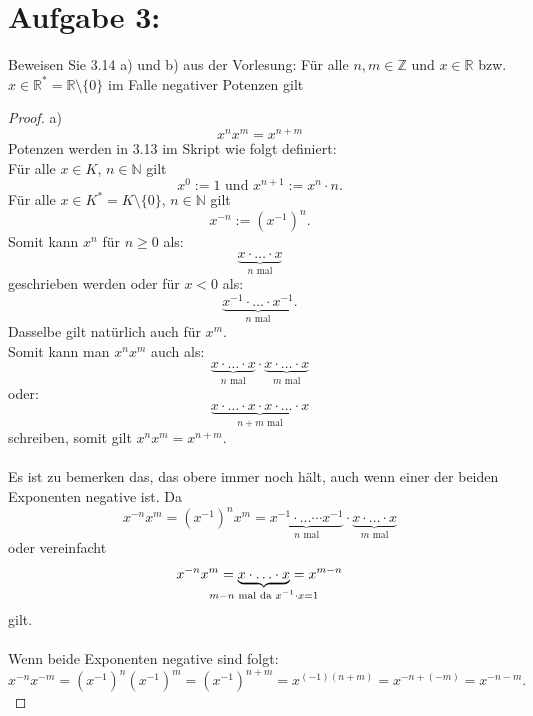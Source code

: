 \documentclass{exam}
\begin{document}
\section*{Aufgabe 3:}
Beweisen Sie 3.14 a) und b) aus der Vorlesung:
\newline\newline
Für alle $n,m \in \mathbb{Z}$ und $x \in \mathbb{R}$ bzw. $x \in \mathbb{R}^* = \mathbb{R}\setminus\{0\}$ im Falle negativer Potenzen gilt
\begin{proof}
	a)
	\begin{displaymath}
		x^nx^m = x^{n+m}
	\end{displaymath}
	Potenzen werden in 3.13 im Skript wie folgt definiert: \\
	Für alle $x \in K$, $n \in \mathbb{N}$ gilt
	\[
		x^0 := 1 \text{ und } x^{n+1}:=x^n \cdot n.
	\]
	Für alle $x \in K^*=K\setminus\{0\}$, $n \in \mathbb{N}$ gilt \[
		x^{-n} := (x^{-1})^n.
	\]
	Somit kann $x^n$ für $n \ge 0$ als: \[
		\underbrace{x \cdot \ldots \cdot x}_{n\text{ mal}}
	\] geschrieben werden oder für $x < 0$ als: \[
		\underbrace{x^{-1} \cdot \ldots \cdot x^{-1}}_{n\text{ mal}}.
	\]
	Dasselbe gilt natürlich auch für $x^m$. \\
	Somit kann man $x^nx^m$ auch als: \[
		\underbrace{x \cdot \ldots \cdot x}_{n\text{ mal}} \cdot \underbrace{x \cdot \ldots \cdot x}_{m\text{ mal}}
	\] oder: \[
		\underbrace{x \cdot \ldots \cdot x \cdot x \cdot \ldots \cdot x}_{n+m\text{ mal}}
	\] schreiben, somit gilt $x^nx^m = x^{n+m}$. \\
	\\
	Es ist zu bemerken das, das obere immer noch hält, auch wenn einer der beiden Exponenten negative ist.
	Da \[
		x^{-n}x^m = {(x^{-1})}^nx^m = \underbrace{x^{-1} \cdot\ldots\cdots x^{-1}}_{n\text{ mal}} \cdot \underbrace{x \cdot \ldots \cdot x}_{m\text{ mal}}
	\] oder vereinfacht \[
		x^{-n}x^m = \underbrace{x \cdot \ldots \cdot x}_{\mathclap{m - n\text{ mal da } x^{-1} \cdot x = 1}} = x^{m-n}
	\] gilt. \\
	\\
	Wenn beide Exponenten negative sind folgt: \[
		x^{-n}x^{-m} = {(x^{-1})}^n{(x^{-1})}^m = {(x^{-1})}^{n+m} = x^{(-1)(n+m)} = x^{-n+(-m)} = x^{-n-m}.
	\]
\end{proof}
\end{document}
